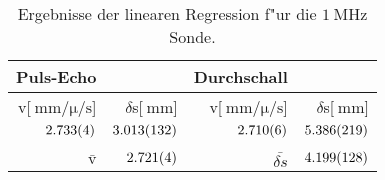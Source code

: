 \begin{table}[!h]
\begin{center}
\begin{tabular}{|r|r|r|r|}
\hline
Puls-Echo & & Durchschall & \\
\hline
\hline
v[$\SI{}{\milli\meter\per\micro\per\second}$] & $\delta$s[$\SI{}{\milli\meter}$] & v[$\SI{}{\milli\meter\per\micro\per\second}$]& $\delta$s[$\SI{}{\milli\meter}$]\\
\hline
$\SI{2.733 (4)}{}$ & $\SI{3.013 (132)}{}$ & $\SI{2.710 (6)}{}$ & $\SI{5.386 (219)}{}$\\
\hline
\hline
\\
$\bar{\mathrm{v}}$ & $\SI{2.721 (4)}{}$ & $\bar{\delta s}$ & $\SI{4.199 (128)}{}$\\
\hline
\end{tabular}
\caption[]{Ergebnisse der linearen Regression f"ur die $\SI{1}{\mega\hertz}$ Sonde.}
\label{r1}
\end{center}
\end{table}